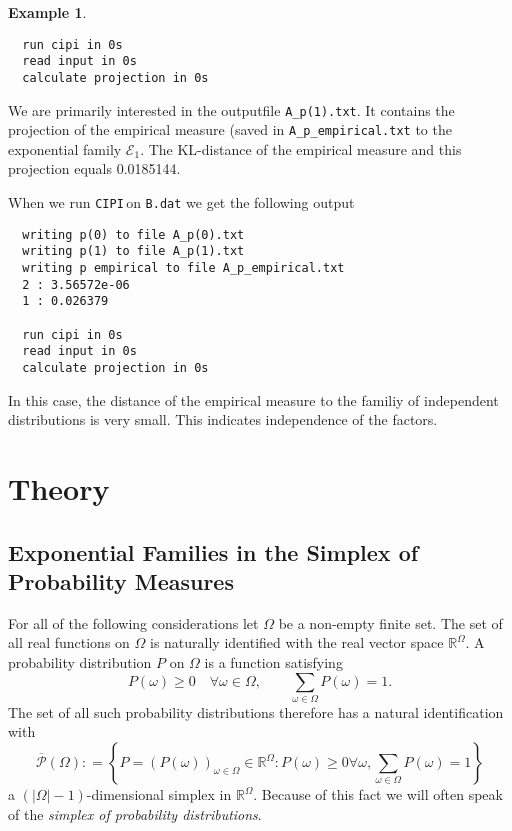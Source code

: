 \documentclass[12pt]{amsart}
\newcommand{\set}[1]{\left\lbrace #1 \right\rbrace} %
\newcommand{\defas}{\mathrel{\mathop{:}}=}   %
\providecommand{\abs}[1]{\left\lvert#1\right\rvert}
\newcommand{\cipi}{\texttt{CIPI}\,}
\theoremstyle{plain}%
\theoremstyle{definition}
\newtheorem{exmp}[thm]{Example}
\theoremstyle{remark}
\begin{document}
\begin{exmp}
\begin{verbatim}
  run cipi in 0s
  read input in 0s
  calculate projection in 0s
  \end{verbatim} We are
  primarily interested in the outputfile \texttt{A\_p(1).txt}. It contains the
  projection of the empirical measure (saved in \texttt{A\_p\_empirical.txt} to
  the exponential family $\mathcal{E}_1$. The KL-distance of the empirical
  measure and this projection equals 0.0185144.
  
  When we run \cipi on \texttt{B.dat} we get the following output
  \begin{verbatim}
  writing p(0) to file A_p(0).txt
  writing p(1) to file A_p(1).txt
  writing p empirical to file A_p_empirical.txt
  2 : 3.56572e-06
  1 : 0.026379

  run cipi in 0s
  read input in 0s
  calculate projection in 0s
  \end{verbatim}

  In this case, the distance of the empirical measure to the familiy of
  independent distributions is very small. This indicates independence of the
  factors. 
\end{exmp}

\section{Theory}
\label{sec:theory}
\subsection{Exponential Families in the Simplex of Probability Measures}
\label{sec:expon-famil-simpl}
For all of the following considerations let $\Omega$ be a non-empty
finite set. The set of all real functions on $\Omega$ is naturally
identified with the real vector space $\mathbb{R}^{\Omega}$. A
probability distribution $P$ on $\Omega$ is a function satisfying
\begin{equation*}
  P(\omega) \geq 0 \quad \forall \omega \in \Omega, \qquad \sum_{\omega\in\Omega} P(\omega) = 1.
\end{equation*}
The set of all such probability distributions therefore has a natural
identification with
\begin{equation*}
  \overline{\mathcal{P}}(\Omega) \defas \set{P = \left(P(\omega)\right)_{\omega\in\Omega} 
    \in \mathbb{R}^{\Omega} : P(\omega) \geq 0 \forall \omega, \sum_{\omega\in\Omega} P(\omega) = 1} 
\end{equation*}
a $\left(\abs{\Omega}-1\right)$-dimensional simplex in
$\mathbb{R}^{\Omega}$. Because of this fact we will often speak of the
\emph{simplex of probability distributions}. 
\end{document}
